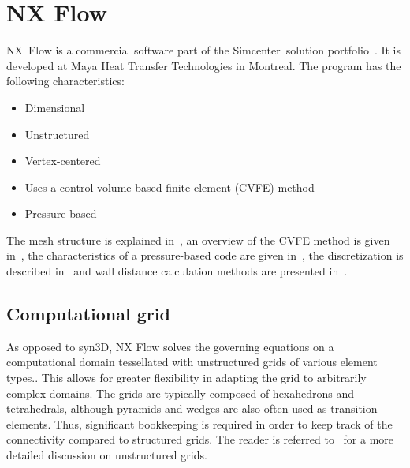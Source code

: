 \section{NX Flow}
\label{sec:nxflow}
%
%
NX\texttrademark~Flow is a commercial software part of the Simcenter\texttrademark~solution portfolio~\cite{nxflow}. It is developed at Maya Heat Transfer Technologies in Montreal. The program has the following characteristics:
\begin{itemize}
    \item Dimensional
    \item Unstructured
    \item Vertex-centered
    \item Uses a control-volume based finite element (CVFE) method
    \item Pressure-based
\end{itemize}
The mesh structure is explained in~, an overview of the CVFE method is given in~, the characteristics of a pressure-based code are given in~, the discretization is described in~ and wall distance calculation methods are presented in~.
%
\subsection{Computational grid}
\label{sec:nxmesh}
%
As opposed to syn3D, NX Flow solves the governing equations on a computational domain tessellated with unstructured grids of various element types.. This allows for greater flexibility in adapting the grid to arbitrarily complex domains. The grids are typically composed of hexahedrons and tetrahedrals, although pyramids and wedges are also often used as transition elements. Thus, significant bookkeeping is required in order to keep track of the connectivity compared to structured grids. The reader is referred to~\cite{blazek2015computational} for a more detailed discussion on unstructured grids.


